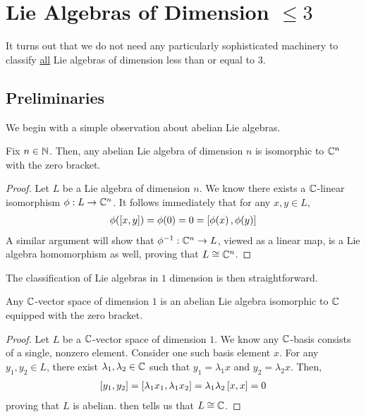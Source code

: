 \section{Lie Algebras of Dimension $\leq 3$}

It turns out that we do not need any particularly sophisticated machinery to classify \underline{all} Lie algebras of dimension less than or equal to $3$.

\subsection{Preliminaries}

We begin with a simple observation about abelian Lie algebras.

\begin{boxproposition}\label{Ch1:Prop:Abelian_Lie_Algebras_Iso}
    Fix $n \in \mathbb{N}$. Then, any abelian Lie algebra of dimension $n$ is isomorphic to $\mathbb{C}^n$ with the zero bracket.
\end{boxproposition}
\begin{proof}
    Let $L$ be a Lie algebra of dimension $n$. We know there exists a $\mathbb{C}$-linear isomorphism $\phi : L \to \mathbb{C}^n$. It follows immediately that for any $x, y \in L$,
    \begin{align*}
        \phi\!\left( \left[ x, y \right] \right) = \phi\!\left( 0 \right) = 0 = \left[ \phi\!\left( x \right), \phi\!\left( y \right) \right]
    \end{align*}
    A similar argument will show that $\phi^{-1} : \mathbb{C}^n \to L$, viewed as a linear map, is a Lie algebra homomorphism as well, proving that $L \cong \mathbb{C}^n$.
\end{proof}

The classification of Lie algebras in $1$ dimension is then straightforward.

\begin{proposition}\label{Ch1:Prop:1D_Lie_Algebras}
    Any $\mathbb{C}$-vector space of dimension $1$ is an abelian Lie algebra isomorphic to $\mathbb{C}$ equipped with the zero bracket.
\end{proposition}
\begin{proof}
    Let $L$ be a $\mathbb{C}$-vector space of dimension $1$. We know any $\mathbb{C}$-basis consists of a single, nonzero element. Consider one such basis element $x$. For any $y_1, y_2 \in L$, there exist $\lambda_1, \lambda_2 \in \mathbb{C}$ such that $y_1 = \lambda_1 x$ and $y_2 = \lambda_2 x$. Then,
    \begin{align*}
        \left[ y_1, y_2 \right] = \left[ \lambda_1 x_1, \lambda_1 x_2 \right] = \lambda_1 \lambda_2 \left[ x, x \right] = 0
    \end{align*}
    proving that $L$ is abelian.  then tells us that $L \cong \mathbb{C}$.
\end{proof}

